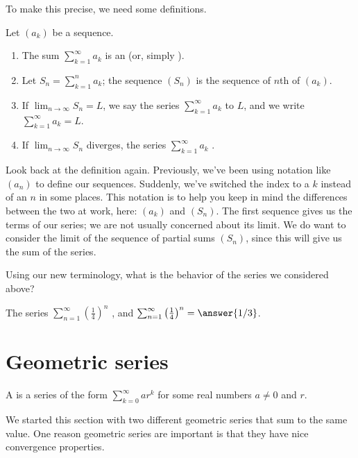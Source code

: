 \documentclass{ximera}
\begin{document}
To make this precise, we need some definitions. 
\begin{definition}
Let $(a_k)$ be a sequence.
\begin{enumerate}
\item The sum $\sum_{k=1}^\infty a_k$ is an  (or,
  simply ).
\item Let $S_n = \sum_{k=1}^n a_k$; the sequence $(S_n)$ is the
  sequence of $n$th  of $(a_k)$.
\item If $\lim_{n\to\infty} S_n = L$, we say the series
  $\sum_{k=1}^\infty a_k$  to $L$, and we write
  $\sum_{k=1}^\infty a_k = L$.
\item If $\lim_{n\to\infty} S_n$ diverges, the series
  $\sum_{k=1}^\infty a_k$ .
\end{enumerate}
\end{definition}

Look back at the definition again. Previously, we've been using 
notation like $(a_n)$ to define our sequences.  Suddenly, we've switched 
the index to a $k$ instead of an $n$ in some places. This notation is to 
help you keep in mind the differences between the two at work, here: $(a_k)$ and $(S_n)$.  The first 
sequence gives us the terms of our series; we are not usually concerned 
about its limit.  We do want to consider the limit of the sequence of 
partial sums $(S_n)$, since this will give us the sum of the series.

\begin{question}
  Using our new terminology, what is the behavior of the series we 
  considered above?
  \begin{prompt}
    The series $\sum_{n=1}^\infty \left(\frac{1}{4}\right)^n$
    , and
      $\sum_{n=1}^\infty \left(\frac{1}{4}\right)^n = \answer{1/3}$.
  \end{prompt}
\end{question}


\section{Geometric series}

\begin{definition}
  A  is a series of the form $\sum_{k=0}^\infty ar^k$
  for some real numbers $a \ne 0$ and $r$.
\end{definition}

We started this section with two different geometric series that sum
to the same value. One reason geometric series are important is that
they have nice convergence properties.
\end{document}
